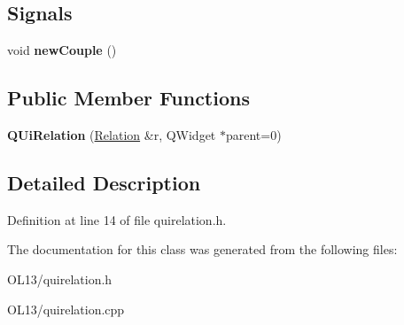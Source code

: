 \subsection*{Signals}
\begin{DoxyCompactItemize}
\item 
\mbox{\label{class_q_ui_relation_a631d95a38337e49c7d83a201d6fbe5a7}} 
void {\bfseries new\+Couple} ()
\end{DoxyCompactItemize}
\subsection*{Public Member Functions}
\begin{DoxyCompactItemize}
\item 
\mbox{\label{class_q_ui_relation_a4d31962371f2008d814958cdf3810e14}} 
{\bfseries Q\+Ui\+Relation} (\hyperlink{class_relation}{Relation} \&r, Q\+Widget $\ast$parent=0)
\end{DoxyCompactItemize}


\subsection{Detailed Description}


Definition at line 14 of file quirelation.\+h.



The documentation for this class was generated from the following files\+:\begin{DoxyCompactItemize}
\item 
O\+L13/quirelation.\+h\item 
O\+L13/quirelation.\+cpp\end{DoxyCompactItemize}
